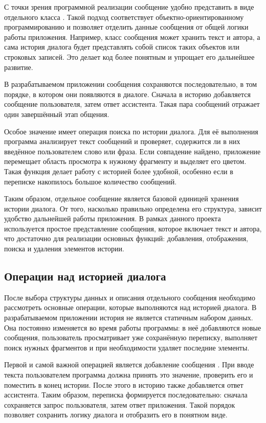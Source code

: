 \documentclass[12pt,a4paper]{article}
\begin{document}
С точки зрения программной реализации сообщение удобно представить в виде отдельного класса \cite{ref6,ref9}. Такой подход соответствует объектно-ориентированному программированию и позволяет отделить данные сообщения от общей логики работы приложения. Например, класс сообщения может хранить текст и автора, а сама история диалога будет представлять собой список таких объектов или строковых записей. Это делает код более понятным и упрощает его дальнейшее развитие.

В разрабатываемом приложении сообщения сохраняются последовательно, в том порядке, в котором они появляются в диалоге. Сначала в историю добавляется сообщение пользователя, затем ответ ассистента. Такая пара сообщений отражает один завершённый этап общения.

Особое значение имеет операция поиска по истории диалога. Для её выполнения программа анализирует текст сообщений и проверяет, содержится ли в них введённое пользователем слово или фраза. Если совпадение найдено, приложение перемещает область просмотра к нужному фрагменту и выделяет его цветом. Такая функция делает работу с историей более удобной, особенно если в переписке накопилось большое количество сообщений.

Таким образом, отдельное сообщение является базовой единицей хранения истории диалога. От того, насколько правильно определена его структура, зависит удобство дальнейшей работы приложения. В рамках данного проекта используется простое представление сообщения, которое включает текст и автора, что достаточно для реализации основных функций: добавления, отображения, поиска и удаления элементов истории.

\subsection{Операции над историей диалога}

После выбора структуры данных и описания отдельного сообщения необходимо рассмотреть основные операции, которые выполняются над историей диалога. В разрабатываемом приложении история не является статичным набором данных. Она постоянно изменяется во время работы программы: в неё добавляются новые сообщения, пользователь просматривает уже сохранённую переписку, выполняет поиск нужных фрагментов и при необходимости удаляет последние элементы.

Первой и самой важной операцией является добавление сообщения \cite{ref1,ref2}. При вводе текста пользователем программа должна принять это значение, проверить его и поместить в конец истории. После этого в историю также добавляется ответ ассистента. Таким образом, переписка формируется последовательно: сначала сохраняется запрос пользователя, затем ответ приложения. Такой порядок позволяет сохранить логику диалога и отобразить его в понятном виде.
\end{document}
